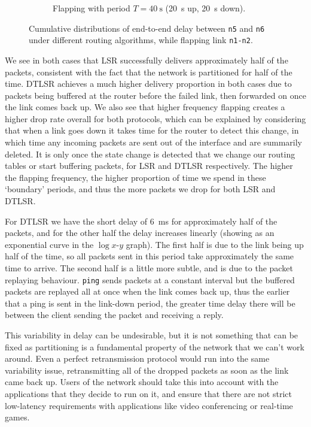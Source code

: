 \documentclass[10pt,twoside,a4paper]{article}
\begin{document}
\begin{figure}[H]
\begin{subfigure}{.5\textwidth}
  \caption{Flapping with period $T=\SI{40}{\s}$ (\SI{20}{\s} up, \SI{20}{\s} down).}
  \label{fig:partition_20}
\end{subfigure}
\caption{Cumulative distributions of end-to-end delay between \texttt{n5} and \texttt{n6} under different routing algorithms, while flapping link \texttt{n1-n2}.}
\label{fig:partition}
\end{figure}

We see in both cases that LSR successfully delivers approximately half of the packets, consistent with the fact that the network is partitioned for half of the time. DTLSR achieves a much higher delivery proportion in both cases due to packets being buffered at the router before the failed link, then forwarded on once the link comes back up. We also see that higher frequency flapping creates a higher drop rate overall for both protocols, which can be explained by considering that when a link goes down it takes time for the router to detect this change, in which time any incoming packets are sent out of the interface and are summarily deleted. It is only once the state change is detected that we change our routing tables or start buffering packets, for LSR and DTLSR respectively. The higher the flapping frequency, the higher proportion of time we spend in these `boundary' periods, and thus the more packets we drop for both LSR and DTLSR.

For DTLSR we have the short delay of \SI{6}{\ms} for approximately half of the packets, and for the other half the delay increases linearly (showing as an exponential curve in the $\log x$-$y$ graph). The first half is due to the link being up half of the time, so all packets sent in this period take approximately the same time to arrive. The second half is a little more subtle, and is due to the packet replaying behaviour. \texttt{ping} sends packets at a constant interval but the buffered packets are replayed all at once when the link comes back up, thus the earlier that a ping is sent in the link-down period, the greater time delay there will be between the client sending the packet and receiving a reply.

This variability in delay can be undesirable, but it is not something that can be fixed as partitioning is a fundamental property of the network that we can't work around. Even a perfect retransmission protocol would run into the same variability issue, retransmitting all of the dropped packets as soon as the link came back up. Users of the network should take this into account with the applications that they decide to run on it, and ensure that there are not strict low-latency requirements with applications like video conferencing or real-time games.
\end{document}
